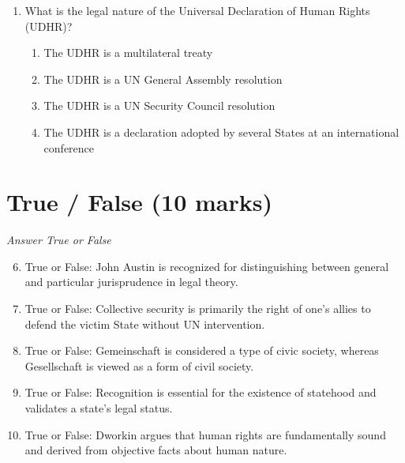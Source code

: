 \documentclass[12pt]{article}
\begin{document}
\begin{enumerate}[label=\arabic*.]
\begin{enumerate}[label=(\alph*)]
    \item The letter is an offer to sell
    \item A valid offer cannot be made by letter.
    \item The letter contains a valid offer which will terminate within a reasonable time.
    \item The letter lacks one of the essential elements of an offer.
\end{enumerate}
\item What is the legal nature of the Universal Declaration of Human Rights (UDHR)?
\begin{enumerate}[label=(\alph*)]
    \item The UDHR is a multilateral treaty
    \item The UDHR is a UN General Assembly resolution
    \item The UDHR is a UN Security Council resolution
    \item The UDHR is a declaration adopted by several States at an international conference
\end{enumerate}
\end{enumerate}

\section*{True / False (10 marks)}
\textit{Answer True or False}
\begin{enumerate}[label=\arabic*.]
\setcounter{enumi}{5}
\item True or False: John Austin is recognized for distinguishing between general and particular jurisprudence in legal theory.
\item True or False: Collective security is primarily the right of one's allies to defend the victim State without UN intervention.
\item True or False: Gemeinschaft is considered a type of civic society, whereas Gesellschaft is viewed as a form of civil society.
\item True or False: Recognition is essential for the existence of statehood and validates a state's legal status.
\item True or False: Dworkin argues that human rights are fundamentally sound and derived from objective facts about human nature.
\end{enumerate}
\end{document}

